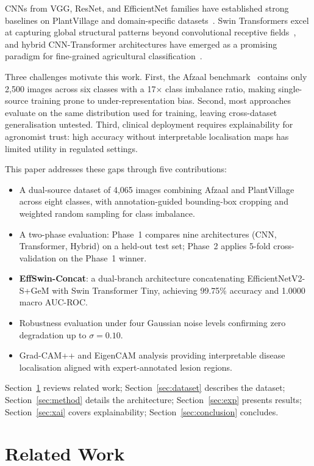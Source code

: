 \documentclass[conference]{IEEEtran}
\begin{document}
CNNs from VGG, ResNet, and EfficientNet families have established strong baselines on PlantVillage and domain-specific datasets~\cite{b3,b7}. Swin Transformers excel at capturing global structural patterns beyond convolutional receptive fields~\cite{b4}, and hybrid CNN-Transformer architectures have emerged as a promising paradigm for fine-grained agricultural classification~\cite{b5}.

Three challenges motivate this work. First, the Afzaal benchmark~\cite{b6} contains only 2,500 images across six classes with a 17$\times$ class imbalance ratio, making single-source training prone to under-representation bias. Second, most approaches evaluate on the same distribution used for training, leaving cross-dataset generalisation untested. Third, clinical deployment requires explainability for agronomist trust: high accuracy without interpretable localisation maps has limited utility in regulated settings.

This paper addresses these gaps through five contributions:
\begin{itemize}
    \item A dual-source dataset of 4,065 images combining Afzaal and PlantVillage across eight classes, with annotation-guided bounding-box cropping and weighted random sampling for class imbalance.
    \item A two-phase evaluation: Phase~1 compares nine architectures (CNN, Transformer, Hybrid) on a held-out test set; Phase~2 applies 5-fold cross-validation on the Phase~1 winner.
    \item \textbf{EffSwin-Concat}: a dual-branch architecture concatenating EfficientNetV2-S+GeM with Swin Transformer Tiny, achieving 99.75\% accuracy and 1.0000 macro AUC-ROC.
    \item Robustness evaluation under four Gaussian noise levels confirming zero degradation up to $\sigma{=}0.10$.
    \item Grad-CAM++ and EigenCAM analysis providing interpretable disease localisation aligned with expert-annotated lesion regions.
\end{itemize}

Section~\ref{sec:related} reviews related work; Section~\ref{sec:dataset} describes the dataset; Section~\ref{sec:method} details the architecture; Section~\ref{sec:exp} presents results; Section~\ref{sec:xai} covers explainability; Section~\ref{sec:conclusion} concludes.

\section{Related Work}
\label{sec:related}
\end{document}
